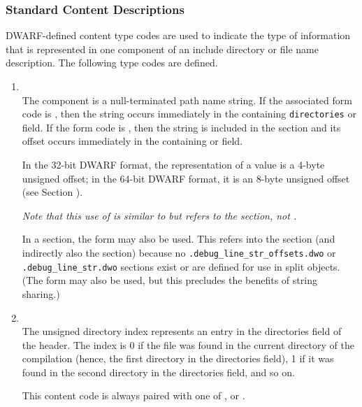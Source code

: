 \subsubsection{Standard Content Descriptions}
\label{chap:standardcontentdescriptions}
DWARF-defined content type codes are used to indicate
the type of information that is represented in one
component of an include directory or file name description.
The following type codes are defined.
\begin{enumerate}[1. ]

\item  \DWLNCTpathTARG \\
The component is a null-terminated path name string.
If the associated form code is \DWFORMstring{}, then the
string occurs immediately in the containing \texttt{directories}
or  field. If the form code is \DWFORMlinestrp{},
then the string is included in the \dotdebuglinestr{} section
and its offset occurs immediately in the containing
 or  field.

In the 32-bit DWARF format, the representation of a
\DWFORMlinestrp{} value is a 4-byte unsigned offset; in the
64-bit DWARF format, it is an 8-byte unsigned offset (see
Section ).

\textit{Note that this use of \DWFORMlinestrp{} is similar to
\DWFORMstrp{} but refers to the \dotdebuglinestr{} section,
not \dotdebugstr.}
   
In a \dotdebuglinedwo{} section, the form \DWFORMstrx{} may
also be used. This refers into the \dotdebugstroffsetsdwo{}
section (and indirectly also the \dotdebugstrdwo{} section)
because no \texttt{.debug\_line\_str\_offsets.dwo} or 
\texttt{.debug\_line\_str.dwo} sections exist or are defined for 
use in split objects. (The form \DWFORMstring{} may also be used, 
but this precludes the benefits of string sharing.)
   
\item \DWLNCTdirectoryindexTARG \\
The unsigned directory index represents an entry in the
directories field of the header. The index is 0 if
the file was found in the current directory of the compilation
(hence, the first directory in the directories field),
1 if it was found in the second directory in the directories
field, and so on.

This content code is always paired with one of \DWFORMdataone, 
\DWFORMdatatwo{} or \DWFORMudata.


\end{enumerate}
